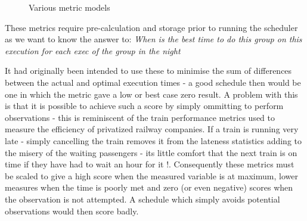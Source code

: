 \begin{figure}[h]
\caption{Various metric models}
\end{figure}

These metrics require pre-calculation and storage prior to running the scheduler as we want to know the answer to: \emph{When is the best time to do this group on this execution for each exec of the group in the night} 


It had originally been intended to use these to minimise the sum of differences between the actual and optimal execution times - a good schedule then would be one in which the metric gave a low or best case zero result. A problem with this is that it is possible to achieve such a score by simply ommitting to perform observations - this is reminiscent of the train performance metrics used to measure the efficiency of privatized railway companies. If a train is running very late - simply cancelling the train removes it from the lateness statistics adding to the misery of the waiting passengers - its little comfort that the next train is on time if they have had to wait an hour for it !. Consequently these metrics must be scaled to give a high score when the measured variable is at maximum, lower measures when the time is poorly met and zero (or even negative) scores when the observation is not attempted. A schedule which simply avoids potential observations would then score badly. 


